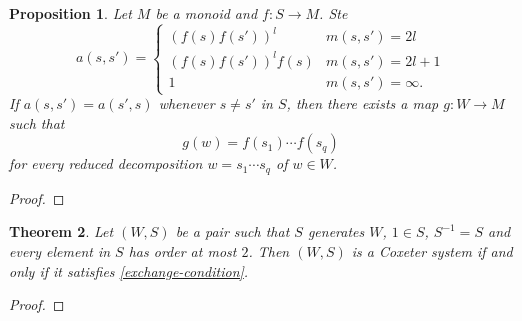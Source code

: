 \documentclass{article}
\theoremstyle{thmstyle}
\newtheorem{theorem}{Theorem}[section]
\newtheorem{proposition}[theorem]{Proposition}
\theoremstyle{defstyle}
\begin{document}
\begin{proposition}
    Let $M$ be a monoid and $f: S\to M$. Ste 
    \begin{equation*}
        a(s, s') = 
        \begin{cases}
            \left(f(s)f(s')\right)^l & m(s, s') = 2l\\
            \left(f(s)f(s')\right)^l f(s) & m(s, s') = 2l + 1\\
            1 & m(s, s') = \infty.
        \end{cases}
    \end{equation*}
    If $a(s, s') = a(s' ,s)$ whenever $s\ne s'$ in $S$, then there exists a map $g: W\to M$ such that 
    \begin{equation*}
        g(w) = f(s_1)\cdots f(s_q)
    \end{equation*}
    for every reduced decomposition $w = s_1\cdots s_q$ of $w\in W$.
\end{proposition}
\begin{proof}
\end{proof}

\begin{theorem}
    Let $(W, S)$ be a pair such that $S$ generates $W$, $1\in S$, $S^{-1} = S$ and every element in $S$ has order at most $2$. Then $(W, S)$ is a Coxeter system if and only if it satisfies \ref{exchange-condition}.
\end{theorem}
\begin{proof}
    
\end{proof}
\end{document}

